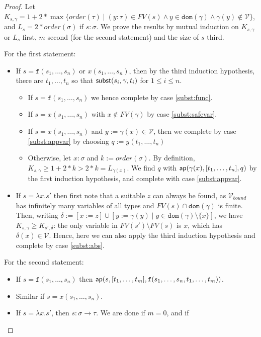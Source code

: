 \documentclass{lmcs}
\theoremstyle{theorem}\newtheorem{theorem}[dummy]{Theorem}
\theoremstyle{theorem}\newtheorem{lemma}[dummy]{Lemma}
\theoremstyle{theorem}\newtheorem{corollary}[dummy]{Corollary}
\theoremstyle{definition}\newtheorem{definition}[dummy]{Definition}
\theoremstyle{definition}\newtheorem{example}[dummy]{Example}
\newcommand{\V}{\mathcal{V}}
\newcommand{\Vbound}{\mathcal{V}_{\mathit{bound}}}
\newcommand{\FV}{\mathit{FV}}
\newcommand{\domain}{\mathtt{dom}}
\newcommand{\order}{\mathit{order}}
\newcommand{\atype}{\sigma}
\newcommand{\btype}{\tau}
\newcommand{\identifier}[1]{\mathtt{#1}}
\newcommand{\afun}{\identifier{f}}
\newcommand{\avar}{x}
\newcommand{\bvar}{y}
\newcommand{\cvar}{z}
\newcommand{\abs}[2]{\lambda #1.#2}
\newcommand{\arrtype}{\rightarrow}
\begin{document}
\begin{proof}
Let $K_{s,\gamma} = 1 + 2 * \max\{ \order(\btype) \mid (\bvar : \btype) \in \FV(s) \wedge \bvar \in
\domain(\gamma) \wedge \gamma(\bvar) \notin \V \}$, and $L_s = 2 * \order(\atype)$ if $s : \atype$.
We prove the results by mutual induction on $K_{s,\gamma}$ or $L_s$ first, $m$ second (for the
second statement) and the size of $s$ third.

For the first statement:
\begin{itemize}
\item If $s = \afun(s_1,\dots,s_n)$ or $x(s_1,\dots,s_n)$, then by the third induction hypothesis,
  there are $t_1,\dots,t_n$ so that $\mathsf{subst}(s_i,\gamma,t_i)$ for $1 \leq i \leq n$.
  \begin{itemize}
  \item If $s = \afun(s_1,\dots,s_n)$ we hence complete by case \ref{subst:func}.
  \item If $s = x(s_1,\dots,s_n)$ with $x \notin \FV(\gamma)$ by case \ref{subst:safevar}.
  \item If $s = x(s_1,\dots,s_n)$ and $y := \gamma(x) \in \V$, then we complete by case
    \ref{subst:appvar} by choosing $q := y(t_1,\dots,t_n)$
  \item Otherwise, let $\avar : \atype$ and $k := \order(\atype)$.  By definition, $K_{s,\gamma}
    \geq 1 + 2 * k > 2 * k = L_{\gamma(\avar)}$.  We find $q$ with
    $\aprel{\gamma(\avar),[t_1,\dots,t_n],q}$ by the first induction hypothesis,
    and complete with case \ref{subst:appvar}.
  \end{itemize}
\item If $s = \abs{\avar}{s'}$ then first note that a suitable $\cvar$ can always be found, as
  $\Vbound$ has infinitely many variables of all types and $\FV(s) \cap \domain(\gamma)$ is
  finite. Then, writing $\delta := [\avar:=\cvar] \cup [\bvar:=\gamma(\bvar) \mid \bvar
  \in \domain(\gamma) \setminus \{\avar\}]$, we have $K_{s,\gamma} \geq K_{s',\delta}$: the only
  variable in $\FV(s') \setminus \FV(s)$ is $\avar$, which has $\delta(\avar) \in \V$.  Hence,
  here we can also apply the third induction hypothesis and complete by case \ref{subst:abs}.
\end{itemize}
For the second statement:
\begin{itemize}
\item If $s = \afun(s_1,\dots,s_n)$ then $\aprel{s, [t_1,\dots,t_m], \afun(s_1,\dots,s_n,t_1,\dots,
  t_m)}$.
\item Similar if $s = \avar(s_1,\dots,s_n)$.
\item If $s = \abs{\avar}{s'}$, then $s : \atype \arrtype \btype$. We are done if $m = 0$, and if

\end{itemize}
\end{proof}
\end{document}
